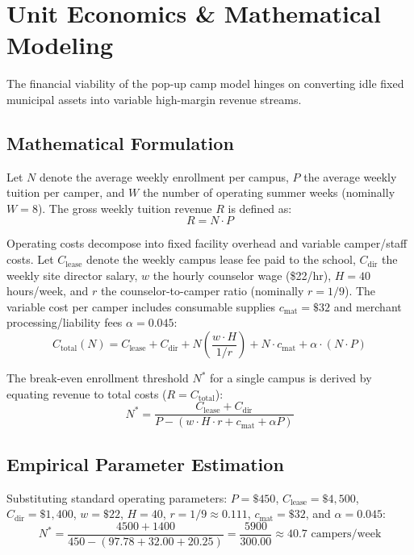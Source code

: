 \documentclass[11pt,a4paper]{article}
\begin{document}
\section{Unit Economics \& Mathematical Modeling}

The financial viability of the pop-up camp model hinges on converting idle fixed municipal assets into variable high-margin revenue streams.

\subsection{Mathematical Formulation}
Let $N$ denote the average weekly enrollment per campus, $P$ the average weekly tuition per camper, and $W$ the number of operating summer weeks (nominally $W = 8$). The gross weekly tuition revenue $R$ is defined as:
\begin{equation}
    R = N \cdot P
\end{equation}

Operating costs decompose into fixed facility overhead and variable camper/staff costs. Let $C_{\text{lease}}$ denote the weekly campus lease fee paid to the school, $C_{\text{dir}}$ the weekly site director salary, $w$ the hourly counselor wage (\$22/hr), $H = 40$ hours/week, and $r$ the counselor-to-camper ratio (nominally $r = 1/9$). The variable cost per camper includes consumable supplies $c_{\text{mat}} = \$32$ and merchant processing/liability fees $\alpha = 0.045$:
\begin{equation}
    C_{\text{total}}(N) = C_{\text{lease}} + C_{\text{dir}} + N \left( \frac{w \cdot H}{1/r} \right) + N \cdot c_{\text{mat}} + \alpha \cdot (N \cdot P)
\end{equation}

The break-even enrollment threshold $N^*$ for a single campus is derived by equating revenue to total costs ($R = C_{\text{total}}$):
\begin{equation}
    N^* = \frac{C_{\text{lease}} + C_{\text{dir}}}{P - \left( w \cdot H \cdot r + c_{\text{mat}} + \alpha P \right)}
\end{equation}

\subsection{Empirical Parameter Estimation}
Substituting standard operating parameters: $P = \$450$, $C_{\text{lease}} = \$4,500$, $C_{\text{dir}} = \$1,400$, $w = \$22$, $H = 40$, $r = 1/9 \approx 0.111$, $c_{\text{mat}} = \$32$, and $\alpha = 0.045$:
\begin{equation}
    N^* = \frac{4500 + 1400}{450 - \left( 97.78 + 32.00 + 20.25 \right)} = \frac{5900}{300.00} \approx 40.7 \text{ campers/week}
\end{equation}
\end{document}
